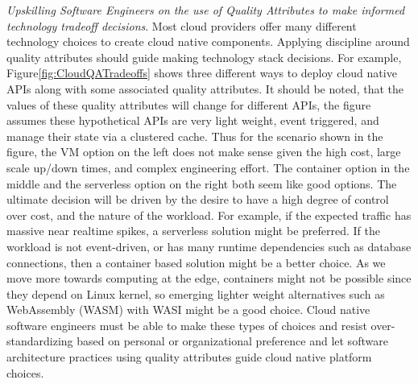 \documentclass[conference]{IEEEtran}
\begin{document}
\textit{Upskilling Software Engineers on the use of Quality Attributes to make informed technology tradeoff decisions}. Most cloud providers offer many different technology choices to create cloud native components.  Applying discipline around quality attributes should guide making technology stack decisions. For example, Figure\ref{fig:CloudQATradeoffs} shows three different ways to deploy cloud native APIs along with some associated quality attributes.  It should be noted, that the values of these quality attributes will change for different APIs, the figure assumes these hypothetical APIs are very light weight, event triggered, and manage their state via a clustered cache.  Thus for the scenario shown in the figure, the VM option on the left does not make sense given the high cost, large scale up/down times, and complex engineering effort.  The container option in the middle and the serverless option on the right both seem like good options.  The ultimate decision will be driven by the desire to have a high degree of control over cost, and the nature of the workload. For example, if the expected traffic has massive near realtime spikes, a serverless solution might be preferred. If the workload is not event-driven, or has many runtime dependencies such as database connections, then a container based solution might be a better choice. As we move more towards computing at the edge, containers might not be possible since they depend on Linux kernel, so emerging lighter weight alternatives such as WebAssembly (WASM) with WASI\cite{WASI} might be a good choice.  Cloud native software engineers must be able to make these types of choices and resist over-standardizing based on personal or organizational preference and let software architecture practices using quality attributes guide cloud native platform choices. 
\end{document}
